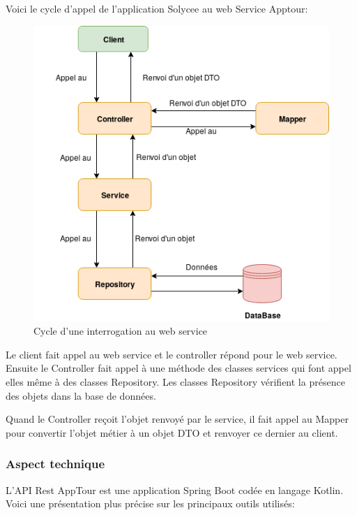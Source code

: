 \documentclass[12pt]{article}
\begin{document}
Voici le cycle  d'appel de l'application Solycee au web Service Apptour:  

\begin{figure}[H]
	\centering
 		\includegraphics[width=1\textwidth]{diagrammes/schema_apptour.png}
  		\caption{Cycle d'une interrogation au web service}
	\end{figure}
	
	Le client fait appel au web service et le controller répond pour le web service. Ensuite le Controller fait appel à une méthode des classes services qui font appel elles même à des classes Repository. Les classes Repository vérifient la présence des objets dans la base de données.
	
	Quand le Controller reçoit l'objet renvoyé par le service, il fait appel au Mapper pour convertir l'objet métier à un objet DTO et renvoyer ce dernier au client.  

\subsubsection{Aspect technique}

L'API Rest AppTour est une application Spring Boot codée en langage Kotlin. Voici une présentation plus précise sur les principaux  
outils utilisés: \\
\end{document}
